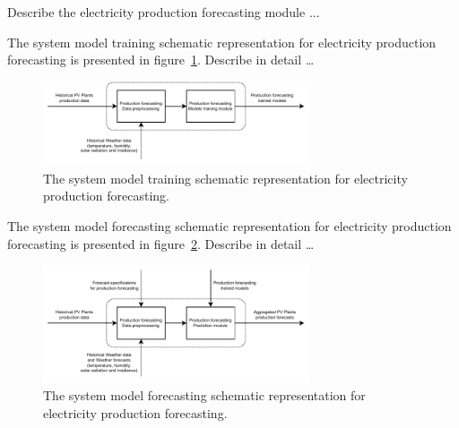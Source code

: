 Describe the electricity production forecasting module ...

The system model training schematic representation for electricity production forecasting is presented in figure~\ref{fig:modeltrainingproduction}.
Describe in detail …

\begin{figure}[H]
\centering
\includegraphics[width=0.7\textwidth]{images/system_model_training_production}
\caption{The system model training schematic representation for electricity production forecasting.}
\label{fig:modeltrainingproduction}
\end{figure}

The system model forecasting schematic representation for electricity production forecasting is presented in figure~\ref{fig:modelforecastingproduction}.
Describe in detail …

\begin{figure}[H]
\centering
\includegraphics[width=0.7\textwidth]{images/system_model_forecasting_production}
\caption{The system model forecasting schematic representation for electricity production forecasting.}
\label{fig:modelforecastingproduction}
\end{figure}
